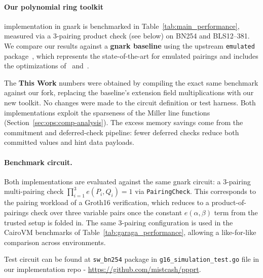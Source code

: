 \paragraph{Our polynomial ring toolkit} implementation in gnark is benchmarked in Table~\ref{tab:main_performance}, measured via a 3-pairing product check (see below) on BN254 and BLS12--381. We compare our results against a \textbf{gnark baseline} using the upstream \texttt{emulated} package~\cite{gnark}, which represents the state-of-the-art for emulated pairings and includes the optimizations of~\cite{PR1CS22} and~\cite{OPP24}.

The \textbf{This Work} numbers were obtained by compiling the exact same benchmark against our fork, replacing the baseline's extension field multiplications with our new toolkit. No changes were made to the circuit definition or test harness. Both implementations exploit the sparseness of the Miller line functions (Section~\ref{sec:ops:comp-analysis}). The excess memory savings come from the commitment and deferred-check pipeline: fewer deferred checks reduce both committed values and hint data payloads.

\paragraph{Benchmark circuit.}
\label{sec:bench-circuit}
Both implementations are evaluated against the same gnark circuit: a 3-pairing multi-pairing check $\prod_{i=1}^{3} e(P_i, Q_i) = 1$ via \texttt{PairingCheck}. This corresponds to the pairing workload of a Groth16 verification, which reduces to a product-of-pairings check over three variable pairs once the constant $e(\alpha, \beta)$ term from the trusted setup is folded in. The same 3-pairing configuration is used in the CairoVM benchmarks of Table~\ref{tab:garaga_performance}, allowing a like-for-like comparison across environments.

Test circuit can be found at \texttt{sw\_bn254} package in \texttt{g16\_simulation\_test.go} file in our implementation repo - \url{https://github.com/mistcash/ppprt}.

